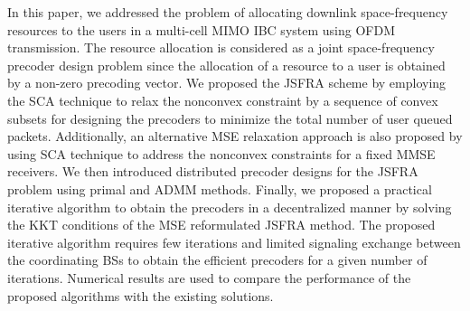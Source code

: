In this paper, we addressed the problem of allocating downlink space-frequency resources to the users in a multi-cell \ac{MIMO} \ac{IBC} system using \ac{OFDM} transmission. The resource allocation is considered as a joint space-frequency precoder design problem since the allocation of a resource to a user is obtained by a non-zero precoding vector. We proposed the \ac{JSFRA} scheme by employing the \ac{SCA} technique to relax the nonconvex constraint by a sequence of convex subsets for designing the precoders to minimize the total number of user queued packets. Additionally, an alternative \ac{MSE} relaxation approach is also proposed by using \ac{SCA} technique to address the nonconvex constraints for a fixed \ac{MMSE} receivers. We then introduced distributed precoder designs for the \ac{JSFRA} problem using primal and \ac{ADMM} methods. Finally, we proposed a practical iterative algorithm to obtain the precoders in a decentralized manner by solving the \ac{KKT} conditions of the \ac{MSE} reformulated \ac{JSFRA} method. The proposed iterative algorithm requires few iterations and limited signaling exchange between the coordinating \acp{BS} to obtain the efficient precoders for a given number of iterations. Numerical results are used to compare the performance of the proposed algorithms with the existing solutions.